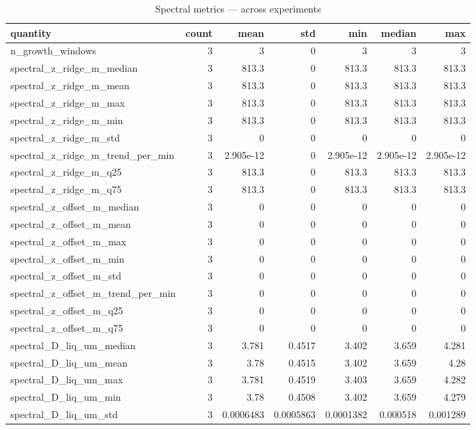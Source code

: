 \begin{table}[htbp]
\centering
\small
\caption{Spectral metrics — across experiments}
\label{tab:ensemble_spectral_agg}
\begin{tabular}{lrrrrrr}
\toprule
quantity & count & mean & std & min & median & max \\
\midrule
n\_growth\_windows & 3 & 3 & 0 & 3 & 3 & 3 \\
spectral\_z\_ridge\_m\_median & 3 & 813.3 & 0 & 813.3 & 813.3 & 813.3 \\
spectral\_z\_ridge\_m\_mean & 3 & 813.3 & 0 & 813.3 & 813.3 & 813.3 \\
spectral\_z\_ridge\_m\_max & 3 & 813.3 & 0 & 813.3 & 813.3 & 813.3 \\
spectral\_z\_ridge\_m\_min & 3 & 813.3 & 0 & 813.3 & 813.3 & 813.3 \\
spectral\_z\_ridge\_m\_std & 3 & 0 & 0 & 0 & 0 & 0 \\
spectral\_z\_ridge\_m\_trend\_per\_min & 3 & 2.905e-12 & 0 & 2.905e-12 & 2.905e-12 & 2.905e-12 \\
spectral\_z\_ridge\_m\_q25 & 3 & 813.3 & 0 & 813.3 & 813.3 & 813.3 \\
spectral\_z\_ridge\_m\_q75 & 3 & 813.3 & 0 & 813.3 & 813.3 & 813.3 \\
spectral\_z\_offset\_m\_median & 3 & 0 & 0 & 0 & 0 & 0 \\
spectral\_z\_offset\_m\_mean & 3 & 0 & 0 & 0 & 0 & 0 \\
spectral\_z\_offset\_m\_max & 3 & 0 & 0 & 0 & 0 & 0 \\
spectral\_z\_offset\_m\_min & 3 & 0 & 0 & 0 & 0 & 0 \\
spectral\_z\_offset\_m\_std & 3 & 0 & 0 & 0 & 0 & 0 \\
spectral\_z\_offset\_m\_trend\_per\_min & 3 & 0 & 0 & 0 & 0 & 0 \\
spectral\_z\_offset\_m\_q25 & 3 & 0 & 0 & 0 & 0 & 0 \\
spectral\_z\_offset\_m\_q75 & 3 & 0 & 0 & 0 & 0 & 0 \\
spectral\_D\_liq\_um\_median & 3 & 3.781 & 0.4517 & 3.402 & 3.659 & 4.281 \\
spectral\_D\_liq\_um\_mean & 3 & 3.78 & 0.4515 & 3.402 & 3.659 & 4.28 \\
spectral\_D\_liq\_um\_max & 3 & 3.781 & 0.4519 & 3.403 & 3.659 & 4.282 \\
spectral\_D\_liq\_um\_min & 3 & 3.78 & 0.4508 & 3.402 & 3.659 & 4.279 \\
spectral\_D\_liq\_um\_std & 3 & 0.0006483 & 0.0005863 & 0.0001382 & 0.000518 & 0.001289 \\

\end{tabular}
\end{table}
